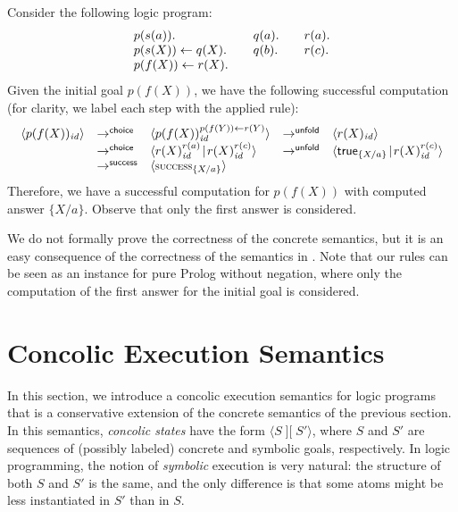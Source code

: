 \documentclass[fleqn]{tlp}
\newcommand{\id}{{\mathit{id}}}
\newcommand{\midd}{\!\mid\!}
\newcommand{\sep}{\mathit{\;]\![\;}}
\newcommand{\success}{\mbox{\footnotesize \textsc{success}}}
\def \tuple#1{\langle #1 \rangle}
\begin{document}
\begin{example} \label{ex1}
  Consider the following logic program:
  \[
  \begin{array}{l@{~~~~~~}l@{~~~~~~}l}
    p(s(a)). &
    q(a).   &
    r(a).  \\
  
    p(s(X)) \leftarrow q(X). & q(b). & r(c). \\
    
    p(f(X)) \leftarrow r(X). & \\
    \end{array}
    \]
    Given the initial goal $p(f(X))$, we have the following successful
    computation (for clarity, we label each step with the applied
    rule):
    \[
    \begin{array}{llllll}
      \tuple{p(f(X))_\id} & \to^\mathsf{choice} &
      \tuple{p(f(X))_\id^{p(f(Y)) \leftarrow r(Y)}} & \to^\mathsf{unfold}
      & \tuple{r(X)_\id} \\
      & \to^\mathsf{choice} & \tuple{r(X)_\id^{r(a)}\midd r(X)_\id^{r(c)}}
      & \to^\mathsf{unfold}
      & \tuple{\mathsf{true}_{\{X/a\}}\midd r(X)_\id^{r(c)}} \\
      & \to^\mathsf{success} & \tuple{\success_{\{X/a\}}} 
    \end{array}
    \]
    Therefore, we have a successful computation for $p(f(X))$ with
    computed answer $\{X/a\}$. Observe that only the first answer is
    considered.
\end{example}
We do not formally prove the correctness of the concrete semantics,
but it is an easy consequence of the correctness of the semantics in
\cite{SESGF11}. Note that our rules can be seen as an instance for
pure Prolog without negation, where only the computation of the first
answer for the initial goal is considered.

\section{Concolic Execution Semantics} \label{concolic}

In this section, we introduce a concolic execution semantics for logic
programs that is a conservative extension of the concrete semantics of
the previous section. 
In this semantics, \emph{concolic states} have the form $\tuple{S\sep
  S'}$, where $S$ and $S'$ are sequences of (possibly labeled)
concrete and symbolic goals, respectively. In logic programming, the
notion of \emph{symbolic} execution is very natural: the structure of
both $S$ and $S'$ is the same, and the only difference is that some
atoms might be less instantiated in $S'$ than in $S$.
\end{document}

